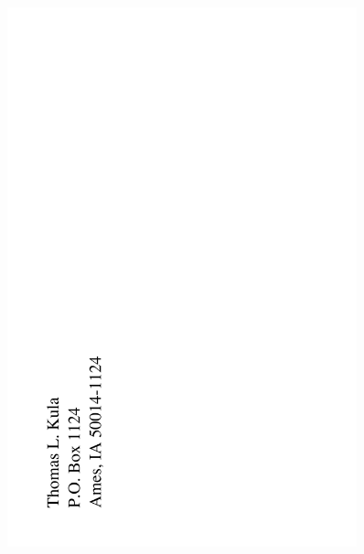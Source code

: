 \documentclass[12pt]{article}
\begin{document}
\includegraphics[width=101mm]{backpage.png}
\end{document}
